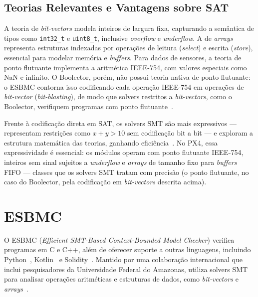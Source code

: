 \subsection{Teorias Relevantes e Vantagens sobre SAT}

A teoria de \textit{bit-vectors} modela inteiros de largura fixa, capturando a
semântica de tipos como \texttt{int32\_t} e \texttt{uint8\_t}, inclusive
\textit{overflow} e \textit{underflow}. A de \textit{arrays} representa estruturas
indexadas por operações de leitura (\textit{select}) e escrita (\textit{store}),
essencial para modelar memória e \textit{buffers}. Para dados de sensores, a
teoria de ponto flutuante implementa a aritmética IEEE-754, com valores especiais
como NaN e infinito. O Boolector, porém, não possui teoria nativa de ponto
flutuante: o ESBMC contorna isso codificando cada operação IEEE-754 em operações
de \textit{bit-vector} (\textit{bit-blasting}), de modo que solvers restritos a
\textit{bit-vectors}, como o Boolector, verifiquem programas com ponto
flutuante~\cite{Gadelha2020}.

Frente à codificação direta em SAT, os solvers SMT são mais expressivos ---
representam restrições como $x + y > 10$ sem codificação bit a bit --- e exploram
a estrutura matemática das teorias, ganhando eficiência~\cite{deMoura2008}. No
PX4, essa expressividade é essencial: os módulos operam com ponto flutuante
IEEE-754, inteiros sem sinal sujeitos a \textit{underflow} e \textit{arrays} de
tamanho fixo para \textit{buffers} FIFO --- classes que os solvers SMT tratam com
precisão (o ponto flutuante, no caso do Boolector, pela codificação em
\textit{bit-vectors} descrita acima).

\section{ESBMC}

O ESBMC (\textit{Efficient SMT-Based Context-Bounded Model Checker}) verifica programas em C e C++, além de oferecer suporte a outras linguagens, incluindo Python~\cite{Farias2024}, Kotlin~\cite{Menezes2022} e Solidity~\cite{ESBMC_GitHub}. Mantido por uma colaboração internacional que inclui pesquisadores da Universidade Federal do Amazonas, utiliza solvers SMT para analisar operações aritméticas e estruturas de dados, como \textit{bit-vectors} e \textit{arrays}~\cite{Cordeiro2012}.

